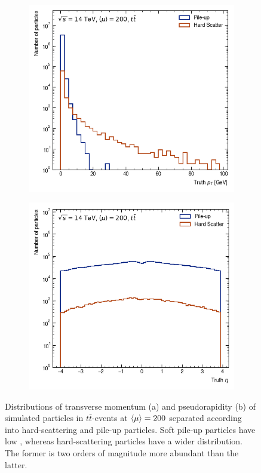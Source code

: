 \begin{figure}[h!]
\begin{subfigure}[b]{0.49\textwidth}
    \centering
    \includegraphics[width=\textwidth]{figures/pt-hist.png}
    \caption{}
    \label{subfig:pt-spectrum}
\end{subfigure}
\begin{subfigure}[b]{0.49\textwidth}
    \centering
    \includegraphics[width=\textwidth]{figures/eta-hist.png}
    \caption{}
    \label{subfig:eta-spectrum}
\end{subfigure}
    \caption{Distributions of transverse momentum \pT (a) and pseudorapidity (b) of simulated particles in $t\bar{t}$-events at $\expval{\mu}=200$ separated according into hard-scattering and pile-up particles. Soft pile-up particles have low \pT, whereas hard-scattering particles have a wider \pT distribution. The former is two orders of magnitude more abundant than the latter.}
    \label{fig:pt-eta-spectrum}
\end{figure}

